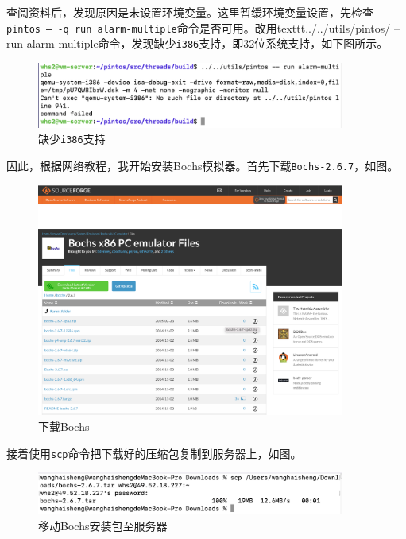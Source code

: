 \documentclass{article}
\begin{document}
查阅资料后，发现原因是未设置环境变量。这里暂缓环境变量设置，先检查\texttt{pintos -- -q run alarm-multiple}命令是否可用。改用texttt{../../utils/pintos/ -- run alarm-multiple}命令，发现缺少\texttt{i386}支持，即32位系统支持，如下图所示。

\begin{figure}[H]
	\centering
	\includegraphics[width=0.9\textwidth]{img/server_failed.png}
	\caption{缺少\texttt{i386}支持}
\end{figure}

因此，根据网络教程，我开始安装Bochs模拟器。首先下载\texttt{Bochs-2.6.7}，如图。

\begin{figure}[H]
	\centering
	\includegraphics[width=0.9\textwidth]{img/server_bochs.png}
	\caption{下载Bochs}
\end{figure}

接着使用\texttt{scp}命令把下载好的压缩包复制到服务器上，如图。

\begin{figure}[H]
	\centering
	\includegraphics[width=0.9\textwidth]{img/server_bochs_scp.png}
	\caption{移动Bochs安装包至服务器}
\end{figure}
\end{document}
